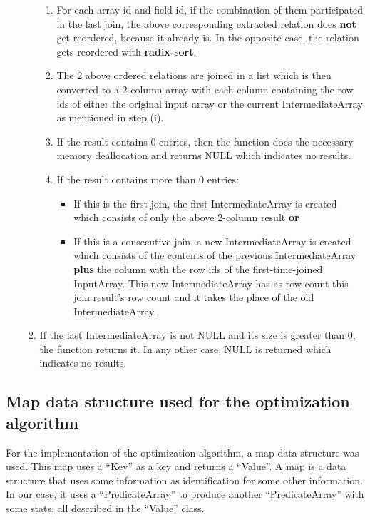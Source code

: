 \documentclass{ws-ijprai}
\begin{document}
\begin{enumerate}
\begin{enumerate}
\begin{enumerate}
            \item For each array id and field id, if the combination of them participated in the last join, the above corresponding extracted relation does \textbf{not} get reordered, because it already is. In the opposite case, the relation gets reordered with \textbf{radix-sort}.
            \item The 2 above ordered relations are joined in a list which is then converted to a 2-column array with each column containing the row ids of either the original input array or the current IntermediateArray as mentioned in step (i).
            \item If the result contains 0 entries, then the function does the necessary memory deallocation and returns NULL which indicates no results.
            \item If the result contains more than 0 entries: 
                \begin{itemize}
                    \item If this is the first join, the first IntermediateArray is created which consists of only the above 2-column result \textbf{or}
                    \item If this is a consecutive join, a new IntermediateArray is created which consists of the contents of the previous IntermediateArray \textbf{plus} the column with the row ids of the first-time-joined InputArray. This new IntermediateArray has as row count this join result's row count and it takes the place of the old IntermediateArray.
                \end{itemize}
        \end{enumerate}
        \item If the last IntermediateArray is not NULL and its size is greater than 0, the function returns it. In any other case, NULL is returned which indicates no results.
    \end{enumerate}
\end{enumerate}

\subsection{Map data structure used for the optimization algorithm}
\tab For the implementation of the optimization algorithm, a map data structure was used. This map uses a “Key” as a key and returns a “Value”. A map is a data structure that uses some information as identification for some other information. In our case, it uses a “PredicateArray” to produce another “PredicateArray” with some stats, all described in the “Value” class.
\end{document}
